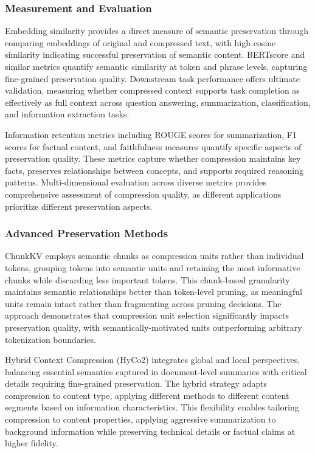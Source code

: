 \documentclass[11pt,letterpaper]{article}
\begin{document}
\subsubsection{Measurement and Evaluation}

Embedding similarity provides a direct measure of semantic preservation through comparing embeddings of original and compressed text, with high cosine similarity indicating successful preservation of semantic content. BERTscore and similar metrics quantify semantic similarity at token and phrase levels, capturing fine-grained preservation quality. Downstream task performance offers ultimate validation, measuring whether compressed context supports task completion as effectively as full context across question answering, summarization, classification, and information extraction tasks.

Information retention metrics including ROUGE scores for summarization, F1 scores for factual content, and faithfulness measures quantify specific aspects of preservation quality. These metrics capture whether compression maintains key facts, preserves relationships between concepts, and supports required reasoning patterns. Multi-dimensional evaluation across diverse metrics provides comprehensive assessment of compression quality, as different applications prioritize different preservation aspects.

\subsubsection{Advanced Preservation Methods}

ChunkKV employs semantic chunks as compression units rather than individual tokens, grouping tokens into semantic units and retaining the most informative chunks while discarding less important tokens. This chunk-based granularity maintains semantic relationships better than token-level pruning, as meaningful units remain intact rather than fragmenting across pruning decisions. The approach demonstrates that compression unit selection significantly impacts preservation quality, with semantically-motivated units outperforming arbitrary tokenization boundaries.

Hybrid Context Compression (HyCo2) integrates global and local perspectives, balancing essential semantics captured in document-level summaries with critical details requiring fine-grained preservation. The hybrid strategy adapts compression to content type, applying different methods to different content segments based on information characteristics. This flexibility enables tailoring compression to content properties, applying aggressive summarization to background information while preserving technical details or factual claims at higher fidelity.
\end{document}
